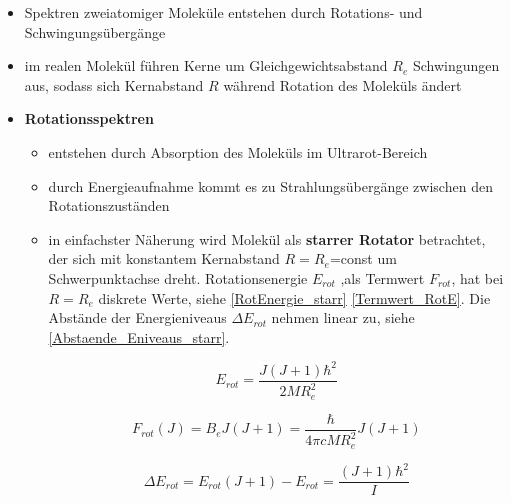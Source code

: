 \begin{itemize}
    \item Spektren zweiatomiger Moleküle entstehen durch Rotations- und Schwingungsübergänge
    \item im realen Molekül führen Kerne um Gleichgewichtsabstand $R_e$ Schwingungen aus, sodass sich Kernabstand $R$ während Rotation des Moleküls ändert
    \item \textbf{Rotationsspektren}
        \begin{itemize}
            \item entstehen durch Absorption des Moleküls im Ultrarot-Bereich
            \item durch Energieaufnahme kommt es zu Strahlungsübergänge zwischen den Rotationszuständen
            \item in einfachster Näherung wird Molekül als \textbf{starrer Rotator} betrachtet, der sich mit konstantem Kernabstand $R=R_e$=const um Schwerpunktachse dreht. Rotationsenergie $E_{rot}$ ,als Termwert $F_{rot}$, hat bei $R=R_e$ diskrete Werte, siehe \ref{RotEnergie_starr} \ref{Termwert_RotE}. Die Abstände der Energieniveaus $\Delta E_{rot}$ nehmen linear zu, siehe \ref{Abstaende_Eniveaus_starr}.

                \begin{equation}
                E_{rot} = \frac{J(J+1)\hbar^2}{2MR_e^2}
                \label{RotEnergie_starr}
                \end{equation}

                \begin{equation}
                F_{rot}(J)=B_eJ(J+1)=\frac{\hbar}{4\pi cMR_e^2}J(J+1)
                \label{Termwert_RotE}
                \end{equation}

                \begin{equation}
                \Delta E_{rot}=E_{rot}(J+1)-E_{rot}=\frac{(J+1)\hbar^2}{I}
                \label{Abstaende_Eniveaus_starr}
                \end{equation}


\end{itemize}
\end{itemize}
